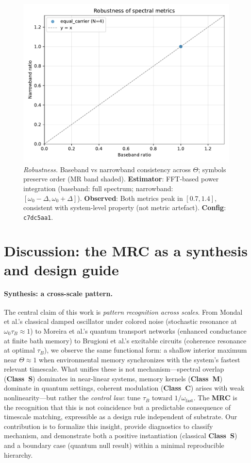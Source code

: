 \documentclass[11pt,letterpaper]{article}
\newcommand{\confighash}{c7dc5aa1}
\DeclareRobustCommand{\mrc}{\textbf{MRC}\xspace}
\DeclareRobustCommand{\classS}{\textbf{Class~S}\xspace}
\DeclareRobustCommand{\classC}{\textbf{Class~C}\xspace}
\DeclareRobustCommand{\classM}{\textbf{Class~M}\xspace}
\begin{document}
\begin{figure}[t]
\centering
\includegraphics[width=0.75\linewidth]{figC_robustness.pdf}
\caption{\label{fig:robustness}\emph{Robustness.} Baseband vs narrowband consistency across $\Theta$; symbols preserve order (MR band shaded). \textbf{Estimator}: FFT-based power integration (baseband: full spectrum; narrowband: $[\omega_0-\Delta,\omega_0+\Delta]$). \textbf{Observed}: Both metrics peak in $[0.7,1.4]$, consistent with system-level property (not metric artefact). \textbf{Config}: \texttt{\confighash}.}
\end{figure}

\clearpage
\section{Discussion: the \mrc as a synthesis and design guide}

\paragraph*{Synthesis: a cross-scale pattern.}
The central claim of this work is \emph{pattern recognition across scales}. From Mondal et al.'s classical damped oscillator under colored noise (stochastic resonance at $\omega_0\tau_B\!\approx\!1$) to Moreira et al.'s quantum transport networks (enhanced conductance at finite bath memory) to Brugioni et al.'s excitable circuits (coherence resonance at optimal $\tau_B$), we observe the same functional form: a shallow interior maximum near $\Theta\!\approx\!1$ when environmental memory synchronizes with the system's fastest relevant timescale. What unifies these is not mechanism---spectral overlap (\classS) dominates in near-linear systems, memory kernels (\classM) dominate in quantum settings, coherent modulation (\classC) arises with weak nonlinearity---but rather the \emph{control law}: tune $\tau_B$ toward $1/\omega_{\mathrm{fast}}$. The \mrc is the recognition that this is not coincidence but a predictable consequence of timescale matching, expressible as a design rule independent of substrate. Our contribution is to formalize this insight, provide diagnostics to classify mechanism, and demonstrate both a positive instantiation (classical \classS) and a boundary case (quantum null result) within a minimal reproducible hierarchy.
\end{document}
